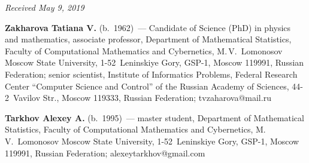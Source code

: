 
\hfill{\small\textit{Received May 9, 2019}}


\vspace*{-12pt}

\Contr

\noindent
\textbf{Zakharova Tatiana V.} (b.\ 1962)~--- 
Candidate of Science (PhD) in physics and mathematics, associate professor,
 Department of Mathematical Statistics, Faculty of Computational Mathematics 
 and Cybernetics, M.\,V.~Lomonosov Moscow State University, 1-52~Leninskiye Gory, 
 GSP-1, Moscow 119991, Russian Federation; senior scientist, Institute of 
 Informatics Problems, Federal Research Center ``Computer Science and Control'' 
 of the Russian Academy of Sciences, 44-2~Vavilov Str., Moscow 119333, 
 Russian Federation; \mbox{tvzaharova@mail.ru}
 
 \vspace*{3pt}

\noindent
\textbf{Tarkhov Alexey A.} (b.\ 1995)~--- 
master student, Department of Mathematical Statistics, Faculty of Computational 
Mathematics and Cybernetics, M.\,V.~Lomonosov Moscow State University, 
1-52~Leninskiye Gory, GSP-1, Moscow 119991, Russian Federation; 
\mbox{alexeytarkhov@gmail.com}

\label{end\stat}

\renewcommand{\bibname}{\protect\rm Литература}  